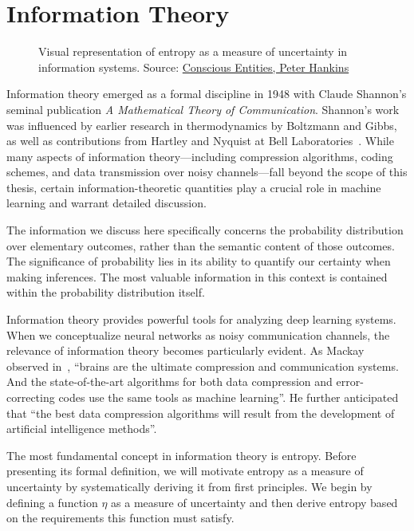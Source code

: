 \section{Information Theory}%
\label{sec:information-theory}
\vspace{1cm}
\begin{figure}[h!]%
	\label{fig:info}
	\centering
	\caption{Visual representation of entropy as a measure of uncertainty in information systems. Source: \href{https://www.consciousentities.com/2017/02/consciousness-entropy/}{Conscious Entities, Peter Hankins}}
\end{figure}
\vspace{1cm}
\noindent Information theory emerged as a formal discipline in 1948 with Claude Shannon's seminal publication \textit{A Mathematical Theory of Communication}. Shannon's work was influenced by earlier research in thermodynamics by Boltzmann and Gibbs, as well as contributions from Hartley and Nyquist at Bell Laboratories~\cite{ref:losee-1997}. While many aspects of information theory—including compression algorithms, coding schemes, and data transmission over noisy channels—fall beyond the scope of this thesis, certain information-theoretic quantities play a crucial role in machine learning and warrant detailed discussion.

\begin{remark}
	The information we discuss here specifically concerns the probability distribution over elementary outcomes, rather than the semantic content of those outcomes. The significance of probability lies in its ability to quantify our certainty when making inferences. The most valuable information in this context is contained within the probability distribution itself.
\end{remark}

Information theory provides powerful tools for analyzing deep learning systems. When we conceptualize neural networks as noisy communication channels, the relevance of information theory becomes particularly evident. As Mackay observed in~\cite{ref:mackay-2003}, ``brains are the ultimate compression and communication systems. And the state-of-the-art algorithms for both data compression and error-correcting codes use the same tools as machine learning''. He further anticipated that ``the best data compression algorithms will result from the development of artificial intelligence methods''.

The most fundamental concept in information theory is entropy. Before presenting its formal definition, we will motivate entropy as a measure of uncertainty by systematically deriving it from first principles. We begin by defining a function $\eta$ as a measure of uncertainty and then derive entropy based on the requirements this function must satisfy.

